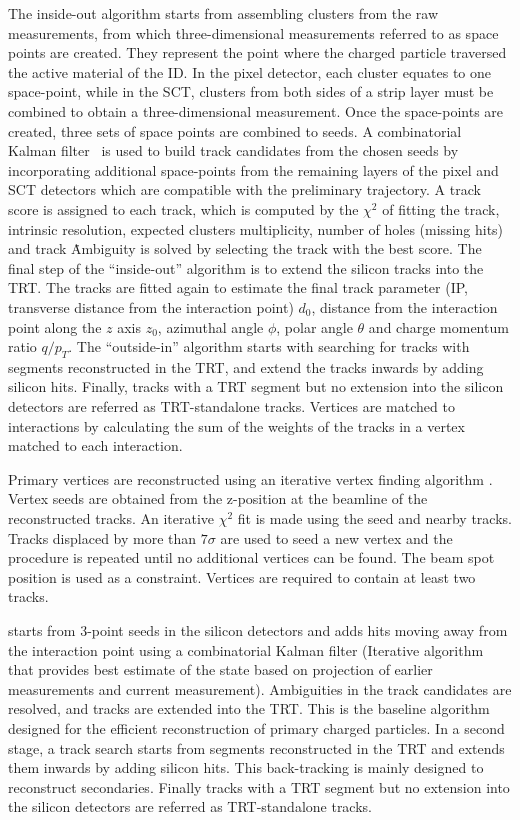 The inside-out algorithm starts from assembling clusters from the
raw measurements, from which three-dimensional measurements referred to as
space points are created. They represent the point where the charged particle 
traversed the active material of the ID. 
In the pixel detector, each cluster 
equates to one space-point, while in the SCT, clusters from both sides of a strip
layer must be combined to obtain a three-dimensional measurement.
Once the space-points are created, three sets of space points are combined to seeds. 
A combinatorial Kalman filter~\cite{FRUHWIRTH1987444} is used to 
build track candidates from the chosen seeds by incorporating additional 
space-points from the remaining layers of the pixel and SCT detectors which 
are compatible with the preliminary trajectory. 
A track score is assigned to each track,
which is computed by the $\chi^2$ of fitting the track, intrinsic resolution, 
expected clusters multiplicity, number of holes (missing hits) and track \pt\. 
Ambiguity is solved by selecting the track with the best score.
The final step of the ``inside-out'' algorithm is to extend the silicon
tracks into the TRT. The tracks are fitted again to estimate the final track
parameter (IP, transverse distance from the interaction point) $d_0$, 
distance from the interaction point along the $z$ axis $z_0$,
azimuthal angle $\phi$, polar angle $\theta$ and charge momentum ratio $q/p_T$.
The ``outside-in'' algorithm starts with searching for tracks with segments 
reconstructed in the TRT, and extend the tracks inwards by adding silicon hits. 
Finally, tracks with a TRT segment but no extension into the silicon detectors
are referred as TRT-standalone tracks. Vertices are
matched to interactions by calculating the sum of the weights of the tracks in a vertex matched to
each interaction.


Primary vertices are reconstructed using an iterative vertex finding algorithm \cite{ATLAS-CONF-2012-042}.
Vertex seeds
are obtained from the z-position at the beamline of the reconstructed tracks. An iterative $\chi^2$ fit
is made using the seed and nearby tracks. Tracks displaced by more than $7\sigma$ are used to seed a
new vertex and the procedure is repeated until no additional vertices can be found. The beam spot
position is used as a constraint. Vertices are required to contain at least two tracks. 

starts from 3-point seeds in the silicon detectors and adds hits moving away from the interaction
point using a combinatorial Kalman filter (Iterative algorithm that provides best estimate of the
state based on projection of earlier measurements and current measurement). Ambiguities in the
track candidates are resolved, and tracks are extended into the TRT. This is the baseline algorithm
designed for the efficient reconstruction of primary charged particles. In a second stage, a track
search starts from segments reconstructed in the TRT and extends them inwards by adding silicon
hits. This back-tracking is mainly designed to reconstruct secondaries. Finally tracks with a TRT
segment but no extension into the silicon detectors are referred as TRT-standalone tracks.


